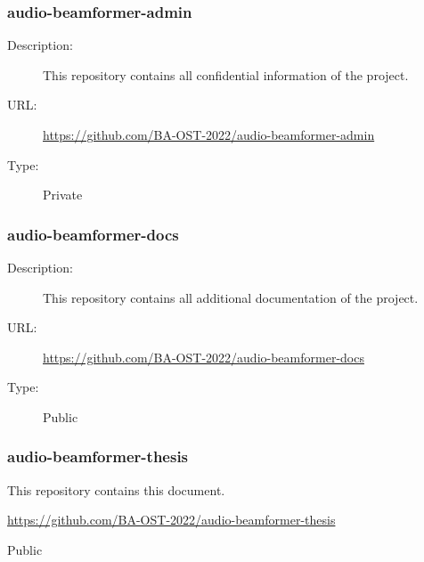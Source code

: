 \subsubsection{audio-beamformer-admin} \label{fleet-monitor-admin} \vspace{-0.2cm}
\begin{description}
  \item[Description:] This repository contains all confidential information of the project.\vspace{-0.25cm}
  \item[URL:] \url{https://github.com/BA-OST-2022/audio-beamformer-admin}\vspace{-0.25cm}
  \item[Type:] Private\vspace{-0.25cm}
\end{description}

\subsubsection{audio-beamformer-docs} \vspace{-0.2cm}
\begin{description}
  \item[Description:] This repository contains all additional documentation of the project.\vspace{-0.25cm}
  \item[URL:] \url{https://github.com/BA-OST-2022/audio-beamformer-docs}\vspace{-0.25cm}
  \item[Type:] Public\vspace{-0.25cm}
\end{description}

\subsubsection{audio-beamformer-thesis} \vspace{-0.2cm}
\begin{description}
  \hfuzz=35.0pt
  \item[Description:] This repository contains this document.\vspace{-0.25cm}
  \item[URL:] \url{https://github.com/BA-OST-2022/audio-beamformer-thesis}\vspace{-0.25cm}
  \item[Type:] Public\vspace{-0.25cm}
\end{description}

